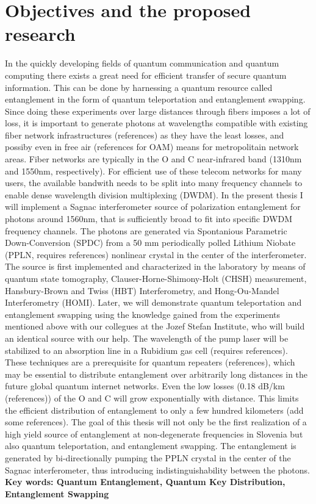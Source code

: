 \documentclass{article}
\theoremstyle{mytheoremstyle}
\theoremstyle{mytheoremstyle}
\theoremstyle{myproblemstyle}
\begin{document}
\section{Objectives and the proposed research}
In the quickly developing fields of quantum communication and quantum computing there exists a great need for efficient transfer of secure quantum information. This can be done
by harnessing a quantum resource called entanglement in the form of quantum teleportation and entanglement swapping. Since doing these experiments over large distances through
fibers imposes a lot of loss, it is important to generate photons at wavelengths compatible with existing fiber network infrastructures (references) as they have the least losses,
and possiby even in free air (references for OAM) means for metropolitain network areas. Fiber networks are typically in the O and C near-infrared band (1310nm and 1550nm, respectively). For
efficient use of these telecom networks for many users, the available bandwith needs to be split into many frequency channels to enable dense wavelength division multiplexing (DWDM).
In the present thesis I will implement a Sagnac interferometer source of polarization entanglement for photons around 1560nm, that is sufficiently broad
to fit into specific DWDM frequency channels. The photons are generated via Spontanious Parametric Down-Conversion (SPDC) from a 50 mm periodically polled Lithium Niobate
(PPLN, requires references) nonlinear crystal in the center of the interferometer. The source is first implemented and characterized in the laboratory by means of quantum state tomography,
Clauser-Horne-Shimony-Holt (CHSH) measurement, Hansbury-Brown and Twiss (HBT) Interferometry, and Hong-Ou-Mandel Interferometry (HOMI). Later, we will demonstrate quantum teleportation and entanglement
swapping using the knowledge gained from the experiments mentioned above with our collegues at the Jozef Stefan Institute, who will build an identical source with our help.
The wavelength of the pump laser will be stabilized to an absorption line in a Rubidium gas cell (requires references). These techniques are a prerequisite for quantum repeaters (references),
which may be essential to distribute entanglement over arbitrarily long distances in the future global quantum internet networks. Even the low losses (0.18 dB/km (references)) of the O and C
will grow exponentially with distance. This limits the efficient distribution of entanglement to only a few hundred kilometers (add some references).
The goal of this thesis will not only be the first realization of a high yield source of entanglement at non-degenerate frequencies in Slovenia but also quantum teleportation, and entanglement swapping.
The entanglement is generated by bi-directionally pumping the PPLN crystal in the center of the Sagnac interferometer, thus introducing indistinguishability between the photons.\\
\textbf{Key words: Quantum Entanglement, Quantum Key Distribution, Entanglement Swapping}
\end{document}
